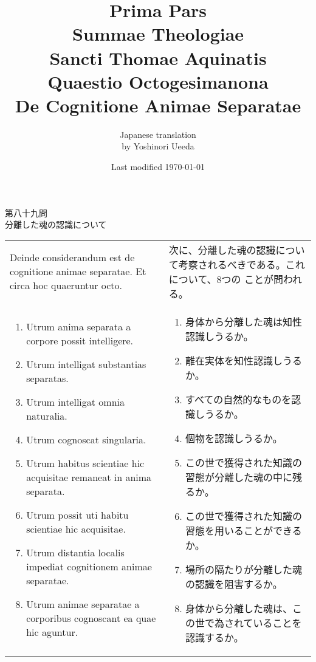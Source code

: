 \documentclass[10pt]{jsarticle} %
\title{{\bf Prima Pars}\\{\HUGE Summae Theologiae}\\Sancti Thomae
Aquinatis\\{\sffamily Quaestio Octogesimanona}\\{\bf De Cognitione Animae Separatae}}
\author{Japanese translation\\by Yoshinori {\sc Ueeda}}
\date{Last modified \today}
\begin{document}
\maketitle

\begin{center}
{\Large 第八十九問\\
分離した魂の認識について}
\end{center}


\begin{longtable}{p{21em}p{21em}}
Deinde considerandum est de cognitione animae separatae. Et circa hoc
quaeruntur octo. 
&
次に、分離した魂の認識について考察されるべきである。これについて、8つの
 ことが問われる。
\\

\begin{enumerate}
 \item Utrum anima separata a corpore possit
intelligere.
 \item Utrum intelligat substantias separatas. 
 \item Utrum intelligat omnia naturalia. 
 \item Utrum cognoscat
singularia. 
 \item Utrum habitus scientiae hic acquisitae remaneat in
anima separata. 
 \item Utrum possit uti habitu scientiae hic
acquisitae. 
 \item Utrum distantia localis impediat cognitionem animae
separatae. 
 \item Utrum animae separatae a corporibus cognoscant ea
quae hic aguntur.
\end{enumerate}

&

\begin{enumerate}
 \item 身体から分離した魂は知性認識しうるか。
 \vspace{4ex}
 \item 離在実体を知性認識しうるか。
 \item すべての自然的なものを認識しうるか。
 \item 個物を認識しうるか。
 \item この世で獲得された知識の習態が分離した魂の中に残るか。
 \item この世で獲得された知識の習態を用いることができるか。
 \item 場所の隔たりが分離した魂の認識を阻害するか。
 \item 身体から分離した魂は、この世で為されていることを認識するか。
\end{enumerate}

\end{longtable}
\end{document}
